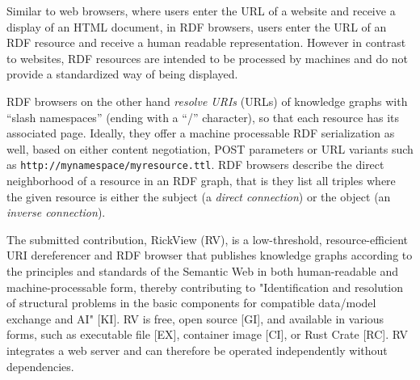 \documentclass{ceurart}
\begin{document}
Similar to web browsers, where users enter the URL of a website and receive a display of an HTML document, in RDF browsers,
users enter the URL of an RDF resource and receive a human readable representation.
However in contrast to websites, RDF resources are intended to be processed by machines and do not provide a standardized way of being displayed.

RDF browsers on the other hand \emph{resolve URIs} (URLs) of knowledge graphs with \enquote{slash namespaces} (ending with a \enquote{/} character), so that each resource has its associated page.
Ideally, they offer a machine processable RDF serialization as well, based on either content negotiation, POST parameters or URL variants such as \texttt{http://mynamespace/myresource.ttl}.
RDF browsers describe the direct neighborhood of a resource in an RDF graph, that is they list all triples where the given resource is either the subject (a \emph{direct connection}) or the object (an \emph{inverse connection}).

The submitted contribution, RickView (RV), is a low-threshold, resource-efficient URI dereferencer and RDF browser that publishes knowledge graphs according to the principles and standards of the Semantic Web in both human-readable and machine-processable form, thereby contributing to "Identification and resolution of structural problems in the basic components for compatible data/model exchange and AI" [KI].
RV is free, open source [GI], and available in various forms, such as executable file [EX], container image [CI], or Rust Crate [RC]. RV integrates a web server and can therefore be operated independently without dependencies.
\end{document}
